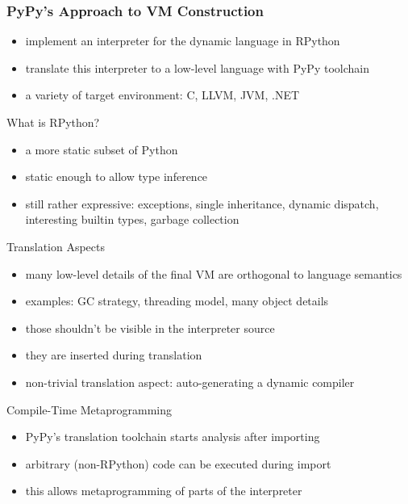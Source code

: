 \documentclass[utf8x]{beamer}
\begin{document}
\begin{frame}
    \frametitle{PyPy's Approach to VM Construction}
    \begin{itemize}
    \item implement an interpreter for the dynamic language in RPython
    \item translate this interpreter to a low-level language with PyPy toolchain
    \item a variety of target environment: C, LLVM, JVM, .NET
    \end{itemize}
    \pause
    \begin{block} {What is RPython?}
        \begin{itemize}
        \item a more static subset of Python
        \item static enough to allow type inference
        \item still rather expressive: exceptions, single inheritance, dynamic dispatch, interesting builtin types, garbage collection
        \end{itemize}
    \end{block}
\end{frame}

\begin{frame}
    \begin{block} {Translation Aspects}
        \begin{itemize}
        \item many low-level details of the final VM are orthogonal to language semantics
        \item examples: GC strategy, threading model, many object details
        \item those shouldn't be visible in the interpreter source
        \item they are inserted during translation
        \pause
        \item non-trivial translation aspect: auto-generating a dynamic compiler
        \end{itemize}
    \end{block}
    \pause
    \begin{block} {Compile-Time Metaprogramming}
        \begin{itemize}
        \item PyPy's translation toolchain starts analysis after importing
        \item arbitrary (non-RPython) code can be executed during import
        \item this allows metaprogramming of parts of the interpreter
        \end{itemize}
    \end{block}
\end{frame}
\end{document}
